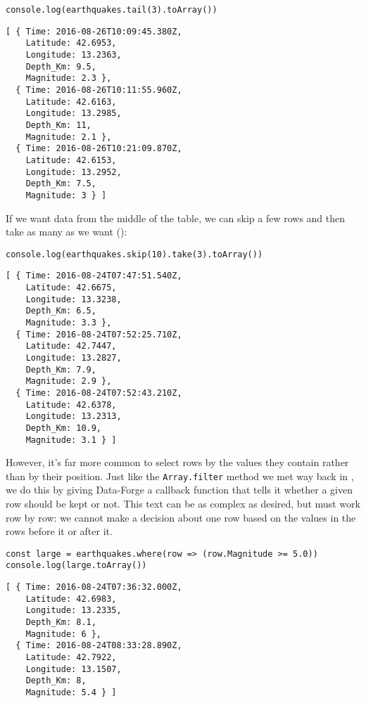 \begin{verbatim}
console.log(earthquakes.tail(3).toArray())
\end{verbatim}

\begin{verbatim}
[ { Time: 2016-08-26T10:09:45.380Z,
    Latitude: 42.6953,
    Longitude: 13.2363,
    Depth_Km: 9.5,
    Magnitude: 2.3 },
  { Time: 2016-08-26T10:11:55.960Z,
    Latitude: 42.6163,
    Longitude: 13.2985,
    Depth_Km: 11,
    Magnitude: 2.1 },
  { Time: 2016-08-26T10:21:09.870Z,
    Latitude: 42.6153,
    Longitude: 13.2952,
    Depth_Km: 7.5,
    Magnitude: 3 } ]
\end{verbatim}

If we want data from the middle of the table,
we can skip a few rows and then take as many as we want ():

\begin{verbatim}
console.log(earthquakes.skip(10).take(3).toArray())
\end{verbatim}

\begin{verbatim}
[ { Time: 2016-08-24T07:47:51.540Z,
    Latitude: 42.6675,
    Longitude: 13.3238,
    Depth_Km: 6.5,
    Magnitude: 3.3 },
  { Time: 2016-08-24T07:52:25.710Z,
    Latitude: 42.7447,
    Longitude: 13.2827,
    Depth_Km: 7.9,
    Magnitude: 2.9 },
  { Time: 2016-08-24T07:52:43.210Z,
    Latitude: 42.6378,
    Longitude: 13.2313,
    Depth_Km: 10.9,
    Magnitude: 3.1 } ]
\end{verbatim}


However,
it's far more common to select rows by the values they contain rather than by their position.
Just like the \texttt{Array.filter} method we met way back in ,
we do this by giving Data-Forge a callback function that tells it whether a given row should be kept or not.
This text can be as complex as desired,
but must work row by row:
we cannot make a decision about one row based on the values in the rows before it or after it.

\begin{verbatim}
const large = earthquakes.where(row => (row.Magnitude >= 5.0))
console.log(large.toArray())
\end{verbatim}

\begin{verbatim}
[ { Time: 2016-08-24T07:36:32.000Z,
    Latitude: 42.6983,
    Longitude: 13.2335,
    Depth_Km: 8.1,
    Magnitude: 6 },
  { Time: 2016-08-24T08:33:28.890Z,
    Latitude: 42.7922,
    Longitude: 13.1507,
    Depth_Km: 8,
    Magnitude: 5.4 } ]
\end{verbatim}
    
